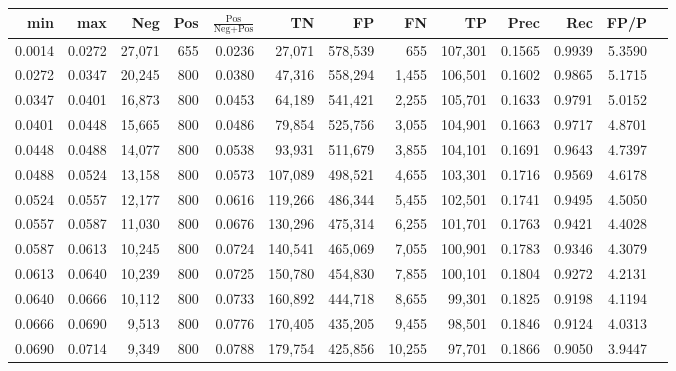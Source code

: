 \begin{tabular}{rrrrrrrrrrrrr}
\toprule
   min &    max &    Neg &   Pos & $\frac{\text{Pos}}{\text{Neg}+\text{Pos}}$ &      TN &      FP &      FN &      TP &   Prec &    Rec &   FP/P \\
\midrule
0.0014 & 0.0272 & 27,071 &   655 &                                     0.0236 &  27,071 & 578,539 &     655 & 107,301 & 0.1565 & 0.9939 & 5.3590 \\
0.0272 & 0.0347 & 20,245 &   800 &                                     0.0380 &  47,316 & 558,294 &   1,455 & 106,501 & 0.1602 & 0.9865 & 5.1715 \\
0.0347 & 0.0401 & 16,873 &   800 &                                     0.0453 &  64,189 & 541,421 &   2,255 & 105,701 & 0.1633 & 0.9791 & 5.0152 \\
0.0401 & 0.0448 & 15,665 &   800 &                                     0.0486 &  79,854 & 525,756 &   3,055 & 104,901 & 0.1663 & 0.9717 & 4.8701 \\
0.0448 & 0.0488 & 14,077 &   800 &                                     0.0538 &  93,931 & 511,679 &   3,855 & 104,101 & 0.1691 & 0.9643 & 4.7397 \\
0.0488 & 0.0524 & 13,158 &   800 &                                     0.0573 & 107,089 & 498,521 &   4,655 & 103,301 & 0.1716 & 0.9569 & 4.6178 \\
0.0524 & 0.0557 & 12,177 &   800 &                                     0.0616 & 119,266 & 486,344 &   5,455 & 102,501 & 0.1741 & 0.9495 & 4.5050 \\
0.0557 & 0.0587 & 11,030 &   800 &                                     0.0676 & 130,296 & 475,314 &   6,255 & 101,701 & 0.1763 & 0.9421 & 4.4028 \\
0.0587 & 0.0613 & 10,245 &   800 &                                     0.0724 & 140,541 & 465,069 &   7,055 & 100,901 & 0.1783 & 0.9346 & 4.3079 \\
0.0613 & 0.0640 & 10,239 &   800 &                                     0.0725 & 150,780 & 454,830 &   7,855 & 100,101 & 0.1804 & 0.9272 & 4.2131 \\
0.0640 & 0.0666 & 10,112 &   800 &                                     0.0733 & 160,892 & 444,718 &   8,655 &  99,301 & 0.1825 & 0.9198 & 4.1194 \\
0.0666 & 0.0690 &  9,513 &   800 &                                     0.0776 & 170,405 & 435,205 &   9,455 &  98,501 & 0.1846 & 0.9124 & 4.0313 \\
0.0690 & 0.0714 &  9,349 &   800 &                                     0.0788 & 179,754 & 425,856 &  10,255 &  97,701 & 0.1866 & 0.9050 & 3.9447 \\

\end{tabular}
